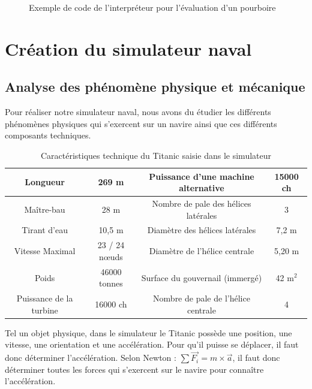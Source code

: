 \documentclass[a4paper,11pt]{article}
\begin{document}
    \begin{figure}[H]
        \begin{center}
            \caption{Exemple de code de l’interpréteur pour l’évaluation d'un pourboire}
            
            \label{fig:codeExemple}
        \end{center}
    \end{figure}

    \newpage
    \section{Création du simulateur naval}

    \subsection{Analyse des phénomène physique et mécanique}

    Pour réaliser notre simulateur naval, nous avons du étudier les différents phénomènes physiques qui s'exercent sur un navire ainsi que ces différents composants techniques.

    \begin{table}[H]
        \caption{Caractéristiques technique du Titanic saisie dans le simulateur}
        \label{tab:TitanicData}

        \begin{center}
            \begin{tabular}{|c|c||c|c|}
                \hline
                Longueur & 269 m & Puissance d'une machine alternative & 15000 ch \tabularnewline
                \hline
                Maître-bau & 28 m & Nombre de pale des hélices latérales & 3 \tabularnewline
                \hline
                Tirant d'eau & 10,5 m & Diamètre des hélices latérales & 7,2 m \tabularnewline
                \hline
                Vitesse Maximal & 23 / 24 nœuds & Diamètre de l'hélice centrale & 5,20 m \tabularnewline
                \hline
                Poids & 46000 tonnes & Surface du gouvernail (immergé) & 42 m$^{2}$ \tabularnewline
                \hline
                Puissance de la turbine & 16000 ch & Nombre de pale de l'hélice centrale & 4 \tabularnewline
                \hline
            \end{tabular}
        \end{center}
    \end{table}

    Tel un objet physique, dans le simulateur le Titanic possède une position, une vitesse, une orientation et une accélération. Pour qu'il puisse se déplacer, il faut donc déterminer l'accélération. Selon Newton : $\sum \overrightarrow{F_{i}} = m \times \overrightarrow{a}$, il faut donc déterminer toutes les forces qui s'exercent sur le navire pour connaître l’accélération.
\end{document}

